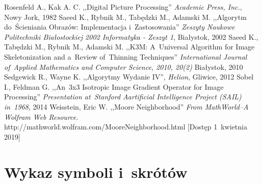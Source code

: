 \documentclass[a4paper,11pt,twoside,openright]{report}
\newcommand\blankpage{%
    \null
    \thispagestyle{empty}%
    \newpage}
\theoremstyle{definition}
\begin{document}
\begin{thebibliography}{24}
 Rosenfeld A., Kak A. C. ,,Digital Picture Processing'' \emph{Academic Press, Inc.}, Nowy Jork, 1982
 Saeed K., Rybnik M., Tabędzki M., Adamski M. ,,Algorytm do~Ścieniania Obrazów: Implementacja i~Zastosowania'' \emph{Zeszyty Naukowe Politechniki Białostockiej 2002 Informatyka - Zeszyt 1}, Białystok, 2002
 Saeed K., Tabędzki M., Rybnik M., Adamski M. ,,K3M: A~Universal Algorithm for Image Skeletonization and a~Review of~Thinning Techniques'' \emph{International Journal of~Applied Mathematics and Computer Science, 2010, 20(2)} Białystok, 2010
 Sedgewick R., Wayne K. ,,Algorytmy Wydanie IV'', \emph{Helion}, Gliwice, 2012
 Sobel I., Feldman G. ,,An~3x3 Isotropic Image Gradient Operator for Image Processing'' \emph {Presentation at~Stanford Aartificial Intelligence Project (SAIL) in~1968}, 2014
 Weisstein, Eric W. ,,Moore Neighborhood'' \emph{From MathWorld--A Wolfram Web Resource.} http://mathworld.wolfram.com/MooreNeighborhood.html [Dostęp 1~kwietnia 2019]

\end{thebibliography}




\afterpage{\blankpage}
\chapter*{Wykaz symboli i~skrótów}
\end{document}
